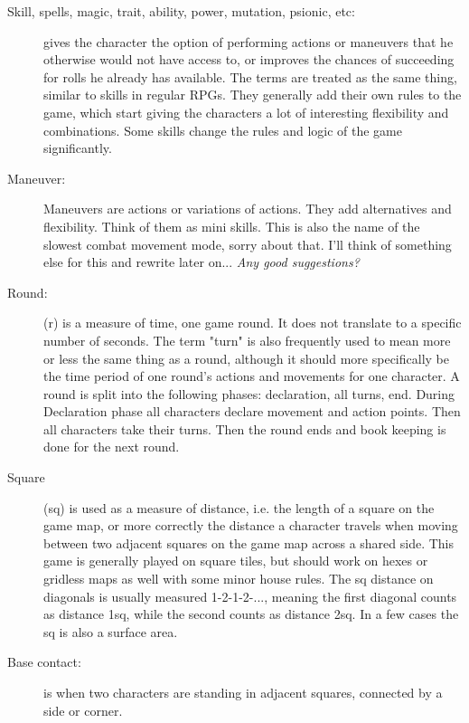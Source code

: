 \begin{description}
\item[Skill, spells, magic, trait, ability, power, mutation, psionic, etc:] gives the character the option of performing actions or maneuvers that he otherwise would not have access to, or improves the chances of succeeding for rolls he already has available. The terms are treated as the same thing, similar to skills in regular RPGs. They generally add their own rules to the game, which start giving the characters a lot of interesting flexibility and combinations. Some skills change the rules and logic of the game significantly.

\item[Maneuver:] Maneuvers are actions or variations of actions. They add alternatives and flexibility. Think of them as mini skills.
This is also the name of the slowest combat movement mode, sorry about that. I'll think of something else for this and rewrite later on... \emph{Any good suggestions?}

\item[Round:] (r) is a measure of time, one game round. It does not translate to a specific number of seconds. The term "turn" is also frequently used to mean more or less the same thing as a round, although it should more specifically be the time period of one round's actions and movements for one character.
A round is split into the following phases: declaration, all turns, end.
During Declaration phase all characters declare movement and action points. Then all characters take their turns. Then the round ends and book keeping is done for the next round.

\item[Square] (sq) is used as a measure of distance, i.e. the length of a square on the game map, or more correctly the distance a character travels when moving between two adjacent squares on the game map across a shared side. This game is generally played on square tiles, but should work on hexes or gridless maps as well with some minor house rules.
The sq distance on diagonals is usually measured 1-2-1-2-..., meaning the first diagonal counts as distance 1sq, while the second counts as distance 2sq.
In a few cases the sq is also a surface area.

\item[Base contact:] is when two characters are standing in adjacent squares, connected by a side or corner.

\end{description}









